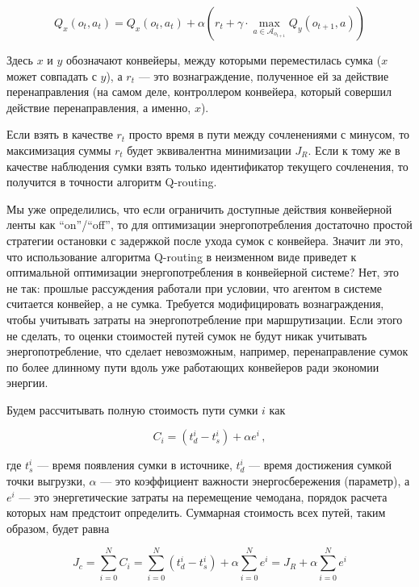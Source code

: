 \documentclass[specification,annotation,times]{itmo-student-thesis}
\theoremstyle{definition}
\begin{document}
\begin{equation}
Q_x(o_t, a_t) = Q_x(o_t, a_t) + \alpha \left( r_t +
\gamma \cdot \max\limits_{a \in \mathcal{A}_{o_{t+1}}} Q_y(o_{t+1}, a) \right)
\end{equation}

Здесь $x$ и $y$ обозначают конвейеры, между которыми переместилась сумка ($x$
может совпадать с $y$),
а $r_t$ --- это вознаграждение, полученное ей за действие перенаправления (на
самом деле, контроллером конвейера, который совершил действие перенаправления, а
именно, $x$).

Если взять в качестве $r_t$ просто время в пути между сочленениями с минусом, то
максимизация суммы $r_t$ будет эквивалентна минимизации $J_R$. Если к тому же в качестве 
наблюдения сумки взять только идентификатор текущего сочленения, то получится в
точности алгоритм Q-routing.

Мы уже определились, что если ограничить доступные действия конвейерной
ленты как ``on''/``off'', то для оптимизации энергопотребления достаточно
простой стратегии остановки с задержкой после ухода сумок с конвейера.
Значит ли это, что использование алгоритма Q-routing в неизменном виде приведет
к оптимальной оптимизации энергопотребления в конвейерной системе? Нет, это не
так: прошлые рассуждения работали при условии, что агентом в системе считается
конвейер, а не сумка. Требуется модифицировать вознаграждения, чтобы учитывать
затраты на энергопотребление при маршрутизации. Если этого не сделать, то
оценки стоимостей путей сумок не будут никак учитывать энергопотребление, что
сделает невозможным, например, перенаправление сумок по более длинному пути
вдоль уже работающих конвейеров ради экономии энергии.

Будем рассчитывать полную стоимость пути сумки $i$ как

\begin{equation}
  C_i = (t_d^i - t_s^i) + \alpha e^i \,,
\end{equation}

где $t_s^i$ --- время появления сумки в источнике, $t_d^i$ --- время достижения
сумкой точки выгрузки, $\alpha$ --- это коэффициент важности энергосбережения
(параметр), а $e^i$ --- это энергетические затраты на перемещение чемодана,
порядок расчета которых нам предстоит определить. Суммарная стоимость всех
путей, таким образом, будет равна

\begin{equation}\label{eqs:J_c}
  J_c = \sum\limits_{i=0}^{N} C_i = \sum\limits_{i=0}^{N} (t_d^i - t_s^i)
  + \alpha \sum\limits_{i=0}^{N} e^i = J_R + \alpha \sum\limits_{i=0}^{N} e^i
\end{equation}
\end{document}
